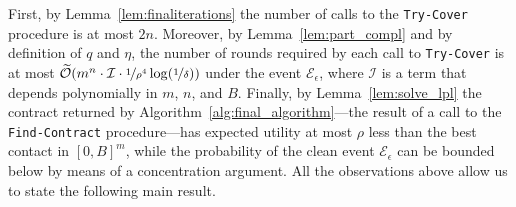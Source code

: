 First, by Lemma~\ref{lem:finaliterations} the number of calls to the \texttt{Try-Cover} procedure is at most $2n$.
%
%
%
%
%
%
Moreover, by Lemma~\ref{lem:part_compl} and by definition of $q$ and $\eta$, the number of rounds required by each call to \texttt{Try-Cover} is at most $\widetilde{\mathcal{O}}( m^n \cdot \mathcal{I} \cdot \nicefrac{1}{\rho^4} \log (\nicefrac{1}{\delta})
)$ under the event $\mathcal{E}_\epsilon$, where $\mathcal{I}$ is a term that depends polynomially in $m$, $n$, and $B$.
%
Finally, by Lemma~\ref{lem:solve_lpl} the contract returned by Algorithm~\ref{alg:final_algorithm}---the result of a call to the \texttt{Find-Contract} procedure---has expected utility at most $\rho$ less than the best contact in $[0,B]^m$,
%
%
while the probability of the clean event $\mathcal{E}_\epsilon$ can be bounded below by means of a concentration argument.
%
All the observations above allow us to state the following main result.
%
